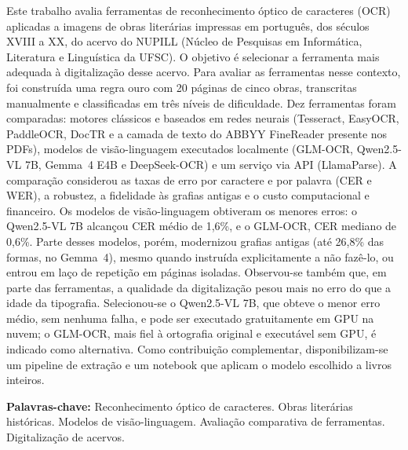 \documentclass[noabntexcite,oneside]{ufsc-thesis-rn46-2019}
\begin{document}
\begin{resumo}[Resumo]

Este trabalho avalia ferramentas de reconhecimento óptico de caracteres (OCR) aplicadas a imagens de obras literárias impressas em português, dos séculos XVIII a XX, do acervo do NUPILL (Núcleo de Pesquisas em Informática, Literatura e Linguística da UFSC). 
O objetivo é selecionar a ferramenta mais adequada à digitalização desse acervo.
Para avaliar as ferramentas nesse contexto, foi construída uma regra ouro com 20 páginas de cinco obras, transcritas manualmente e classificadas em três níveis de dificuldade.
Dez ferramentas foram comparadas: motores clássicos e baseados em
redes neurais (Tesseract, EasyOCR, PaddleOCR, DocTR e a camada de texto do ABBYY
FineReader presente nos PDFs), modelos de visão-linguagem executados localmente (GLM-OCR,
Qwen2.5-VL 7B, Gemma~4 E4B e DeepSeek-OCR) e um serviço via API (LlamaParse). A comparação considerou as taxas de erro por caractere e por palavra (CER e WER), a
robustez, a fidelidade às grafias antigas e o custo computacional e financeiro. Os modelos
de visão-linguagem obtiveram os menores erros: o Qwen2.5-VL 7B alcançou CER médio de 1,6\%,
e o GLM-OCR, CER mediano de 0,6\%. Parte desses modelos, porém, modernizou grafias antigas
(até 26,8\% das formas, no Gemma~4), mesmo quando instruída explicitamente a não fazê-lo,
ou entrou em laço de repetição em páginas isoladas. Observou-se também que, em parte das
ferramentas, a qualidade da digitalização pesou mais no erro do que a idade da tipografia. Selecionou-se o Qwen2.5-VL 7B, que obteve o menor erro médio, sem
nenhuma falha, e pode ser executado gratuitamente em GPU na nuvem; o GLM-OCR, mais fiel à
ortografia original e executável sem GPU, é indicado como alternativa. Como contribuição
complementar, disponibilizam-se um pipeline de extração e um notebook que aplicam o modelo escolhido a livros inteiros.

\vspace{\baselineskip}
\textbf{Palavras-chave:} Reconhecimento óptico de caracteres. Obras literárias
históricas. Modelos de visão-linguagem. Avaliação comparativa de ferramentas.
Digitalização de acervos.

\end{resumo}
\end{document}
